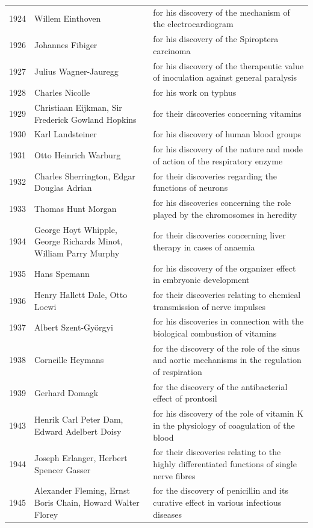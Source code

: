 \documentclass[12pt,a4paper]{book}
\begin{document}
{\begin{longtable}{cp{3.2cm}p{5.5cm}}
1924 & Willem Einthoven & for his discovery of the mechanism of the electrocardiogram \\
1926 & Johannes Fibiger & for his discovery of the Spiroptera carcinoma \\
1927 & Julius Wagner-Jauregg & for his discovery of the therapeutic value of inoculation against general paralysis \\
1928 & Charles Nicolle & for his work on typhus \\
1929 & Christiaan Eijkman, Sir Frederick Gowland Hopkins & for their discoveries concerning vitamins \\
1930 & Karl Landsteiner & for his discovery of human blood groups \\
1931 & Otto Heinrich Warburg & for his discovery of the nature and mode of action of the respiratory enzyme \\
1932 & Charles Sherrington, Edgar Douglas Adrian & for their discoveries regarding the functions of neurons \\
1933 & Thomas Hunt Morgan & for his discoveries concerning the role played by the chromosomes in heredity \\
1934 & George Hoyt Whipple, George Richards Minot, William Parry Murphy & for their discoveries concerning liver therapy in cases of anaemia \\
1935 & Hans Spemann & for his discovery of the organizer effect in embryonic development \\
1936 & Henry Hallett Dale, Otto Loewi & for their discoveries relating to chemical transmission of nerve impulses \\
1937 & Albert Szent-Gy\"orgyi & for his discoveries in connection with the biological combustion of vitamins \\
1938 & Corneille Heymans & for the discovery of the role of the sinus and aortic mechanisms in the regulation of respiration \\
1939 & Gerhard Domagk & for the discovery of the antibacterial effect of prontosil \\
1943 & Henrik Carl Peter Dam, Edward Adelbert Doisy & for his discovery of the role of vitamin K in the physiology of coagulation of the blood \\
1944 & Joseph Erlanger, Herbert Spencer Gasser & for their discoveries relating to the highly differentiated functions of single nerve fibres \\
1945 & Alexander Fleming, Ernst Boris Chain, Howard Walter Florey & for the discovery of penicillin and its curative effect in various infectious diseases \\

\end{longtable}}
\end{document}
